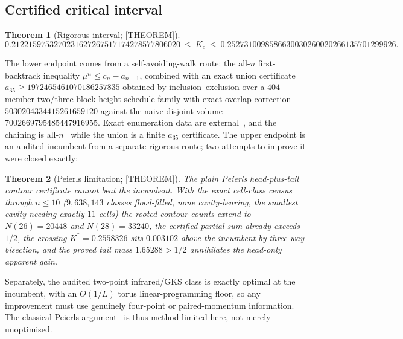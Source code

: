 \documentclass[11pt]{article}
\newtheorem{theorem}{Theorem}[section]
\theoremstyle{definition}
\begin{document}
\subsection{Certified critical interval}\label{sec:bounds}
\begin{theorem}[Rigorous interval; {[THEOREM]}]\label{thm:interval}
\[
0.2122159753270231627267517174278577806020\ \le\ K_c\ \le\
0.2527310098586630030260020266135701299926 .
\]
\end{theorem}

The lower endpoint comes from a self-avoiding-walk route: the all-$n$ first-backtrack inequality
$\mu^n\le c_n-a_{n-1}$, combined with an exact union certificate $a_{35}\ge1972465461070186257835$
obtained by inclusion--exclusion over a $404$-member two/three-block height-schedule family with
exact overlap correction $5030204334415261659120$ against the naive disjoint volume
$7002669795485447916955$. Exact enumeration data are external~\cite{schram2011_exact_saw,%
macdonald2000_saw}, and the chaining is all-$n$~\cite{kesten1963_saw_ratio} while the union is a
finite $a_{35}$ certificate. The upper endpoint is an audited incumbent from a separate rigorous
route; two attempts to improve it were closed exactly:

\begin{theorem}[Peierls limitation; {[THEOREM]}]
The plain Peierls head-plus-tail contour certificate cannot beat the incumbent. With the exact
cell-class census through $n\le10$ ($9{,}638{,}143$ classes flood-filled, none cavity-bearing, the
smallest cavity needing exactly $11$ cells) the rooted contour counts extend to $N(26)=20448$ and
$N(28)=33240$, the certified partial sum already exceeds $1/2$, the crossing $K^*=0.2558326$ sits
$0.003102$ above the incumbent by three-way bisection, and the proved tail mass $1.65288>1/2$
annihilates the head-only apparent gain.
\end{theorem}

Separately, the audited two-point infrared/GKS class is exactly optimal at the incumbent, with an
$O(1/L)$ torus linear-programming floor, so any improvement must use genuinely four-point or
paired-momentum information. The classical Peierls argument~\cite{peierls1936_ising,%
griffiths1964_peierls,friedli_velenik2017_ising_ch3} is thus method-limited here, not merely
unoptimised.
\end{document}
